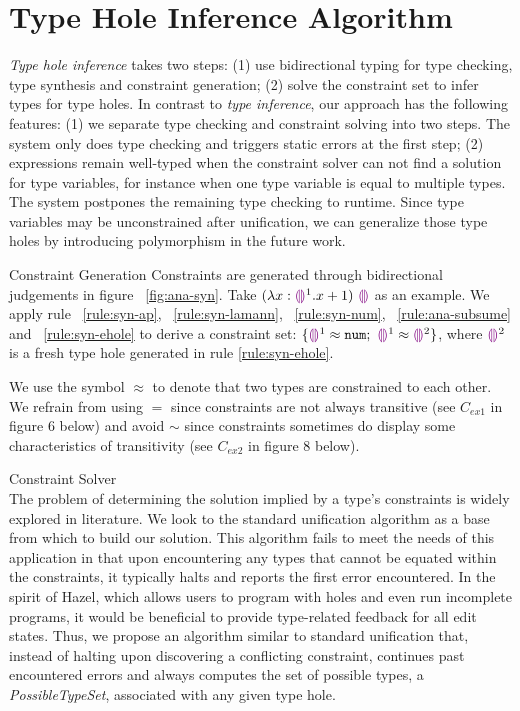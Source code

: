 
\usetikzlibrary{positioning,calc}

\section{Type Hole Inference Algorithm}
\label{sec:infalg}
\emph{Type hole inference} takes two steps: (1) use bidirectional typing for type checking, type synthesis and constraint generation; (2) solve the constraint set to infer types for type holes. In contrast to \emph{type inference}, our approach has the following features: (1) we separate type checking and constraint solving into two steps. The system only does type checking and triggers static errors at the first step; (2) expressions remain well-typed when the constraint solver can not find a solution for type variables, for instance when one type variable is equal to multiple types. The system postpones the remaining type checking to runtime. Since  type variables may be unconstrained after unification, we can generalize those type holes by introducing polymorphism in the future work. 
\par
\par{Constraint Generation} Constraints are generated through bidirectional judgements in figure ~\ref{fig:ana-syn}. Take $(\lambda x:\textcolor{violet}{\llparenthesis}\textcolor{violet}{\rrparenthesis}^{1}. x+1)~ \textcolor{violet}{\llparenthesis}\textcolor{violet}{\rrparenthesis}$ as an example. We apply rule ~\ref{rule:syn-ap}, ~\ref{rule:syn-lamann}, ~\ref{rule:syn-num}, ~\ref{rule:ana-subsume} and ~\ref{rule:syn-ehole} to derive a constraint set: $\{\textcolor{violet}{\llparenthesis}\textcolor{violet}{\rrparenthesis}^{1} \approx \mathtt{num};~ \textcolor{violet}{\llparenthesis}\textcolor{violet}{\rrparenthesis}^{1} \approx \textcolor{violet}{\llparenthesis}\textcolor{violet}{\rrparenthesis}^{2}\}$, where $\textcolor{violet}{\llparenthesis}\textcolor{violet}{\rrparenthesis}^{2}$ is a fresh type hole generated in rule \ref{rule:syn-ehole}. 

We use the symbol $\approx$ to denote that two types are constrained to each other. We refrain from using $=$ since constraints are not always transitive (see $C_{ex1}$ in figure 6 below) and avoid $\sim$ since constraints sometimes do display some characteristics of transitivity (see $C_{ex2}$ in figure 8 below).
\par
\par{Constraint Solver} \\
The problem of determining the solution implied by a type's constraints is widely explored in literature. We look to the standard unification algorithm \cite{RobinUnification} as a base from which to build our solution. This algorithm fails to meet the needs of this application in that upon encountering any types that cannot be equated within the constraints, it typically halts and reports the first error encountered.
In the spirit of Hazel, which allows users to program with holes and even run incomplete programs, it would be beneficial to provide type-related feedback for all edit states. Thus, we propose an algorithm similar to standard unification that, instead of halting upon discovering a conflicting constraint, continues past encountered errors and always computes the set of possible types, a \textit{PossibleTypeSet}, associated with any given type hole.

